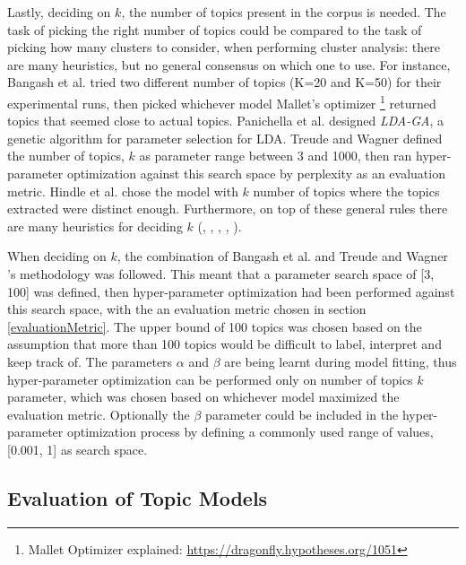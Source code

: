         Lastly, deciding on $k$, the number of topics present in the corpus is needed. The task of picking the right number of topics could be compared to the task of picking how many clusters to consider, when performing cluster analysis: there are many heuristics, but no general consensus on which one to use. For instance, Bangash et al. \cite{bangash2019developers} tried two different number of topics (K=20 and K=50) for their experimental runs, then picked whichever model Mallet’s optimizer \footnote{Mallet Optimizer explained: \url{https://dragonfly.hypotheses.org/1051}} returned topics that seemed close to actual topics. Panichella et al. \cite{panichella2013effectively} designed \textit{LDA-GA}, a genetic algorithm for parameter selection for LDA. Treude and Wagner \cite{treude2019predicting} defined the number of topics, $k$ as parameter range between 3 and 1000, then ran hyper-parameter optimization against this search space by perplexity as an evaluation metric. Hindle et al. \cite{hindle2012relating} chose the model with $k$ number of topics where the topics extracted were distinct enough. Furthermore, on top of these general rules there are many heuristics for deciding $k$ (\cite{arun2010finding}, \cite{cao2009density}, \cite{deveaud2014accurate}, \cite{griffiths2004finding}, \cite{zhao2015heuristic}).
        
        When deciding on $k$, the combination of Bangash et al. \cite{bangash2019developers} and Treude and Wagner \cite{treude2019predicting}'s methodology was followed. This meant that a parameter search space of [3, 100] was defined, then hyper-parameter optimization had been performed against this search space, with the an evaluation metric chosen in section \ref{evaluationMetric}. The upper bound of 100 topics was chosen based on the assumption that more than 100 topics would be difficult to label, interpret and keep track of. The parameters $\alpha$ and $\beta$ are being learnt during model fitting, thus  hyper-parameter optimization can be performed only on number of topics $k$ parameter, which was chosen based on whichever model maximized the evaluation metric. Optionally the $\beta$ parameter could be included in the hyper-parameter optimization process by defining a commonly used range of values, [0.001, 1] as search space.
    
    \subsection{Evaluation of Topic Models\label{evaluationMetric}}
    
